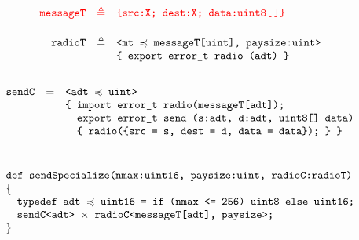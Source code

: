 $$
\begin{array}{rcl}
\texttt{\color{red}{messageT}} &\color{red}{\triangleq}& \texttt{\color{red}{\{src:X; dest:X; data:uint8[\,]\}}} \\[5mm]
\texttt{radioT} &\triangleq& \texttt{<mt $\preccurlyeq$ messageT[uint], paysize:uint>} \\
 & & \texttt{\{\ export\  error\_t\ radio (adt)\ \}}\\[5mm]
\end{array} 
$$
$$
\begin{array}{lcl}
\texttt{sendC} & = & \texttt{<adt $\subtype$ uint>}\\
&& \texttt{\{ import error\_t radio(messageT[adt]);}\\
&& \texttt{\phantom{\{ }export error\_t send (s:adt, d:adt, uint8[] data)}\\
&& \texttt{\phantom{\{ }\{ radio(\{src = s, dest = d, data = data\}); \}\ \}}\\[10mm]
\multicolumn{3}{l}{\texttt{def sendSpecialize(nmax:uint16, paysize:uint, radioC:radioT)}}\\
\{\\
\multicolumn{3}{l}{\quad \texttt{typedef adt $\subtype$ uint16 = if (nmax <= 256) uint8 else uint16;}}\\
\multicolumn{3}{l}{\quad \texttt{sendC<adt> $\ltimes$ radioC<messageT[adt], paysize>;}}\\
\}
\end{array}
$$

\stopslide


